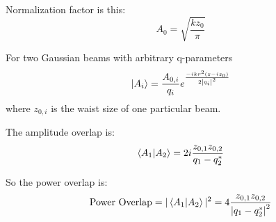 \documentclass[oneside]{book}
\begin{document}
\begin{appendices}
	Normalization factor is this:
	\begin{equation}
	A_0 = \sqrt{\frac{k z_0}{\pi}}
	\end{equation}

	For two Gaussian beams with arbitrary q-parameters
	\begin{equation}
	\ket{A_i} = \frac{A_{0,i}}{q_i} e^{ \frac{-ikr^2(z-iz_0)}{2\abs{q_i}^2 }}
	\end{equation}
	where $z_{0,i}$ is the waist size of one particular beam.
	
	The amplitude overlap is:
	\begin{equation}
	\braket{A_1|A_2} = 2 i  \frac{ z_{0,1}z_{0,2}}{q_1 - q_2^*}
	\end{equation}
	
	So the power overlap is:
	\begin{equation}
	\text{Power Overlap} = \vert \braket{A_1|A_2} \vert^2 = 4 \frac{ z_{0,1}z_{0,2}}{\abs{q_1 - q_2^*}^2}
	\end{equation}


\end{appendices} 

\medskip



\end{document}
